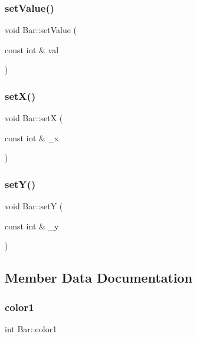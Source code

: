 \subsubsection{\texorpdfstring{set\+Value()}{setValue()}}
{\footnotesize\ttfamily void Bar\+::set\+Value (\begin{DoxyParamCaption}\item[{const int \&}]{val }\end{DoxyParamCaption})\hspace{0.3cm}{\ttfamily [inline]}}

\mbox{\label{class_bar_aa2c599d99b800583912ae4eceaceab25}} 
\subsubsection{\texorpdfstring{set\+X()}{setX()}}
{\footnotesize\ttfamily void Bar\+::setX (\begin{DoxyParamCaption}\item[{const int \&}]{\+\_\+x }\end{DoxyParamCaption})\hspace{0.3cm}{\ttfamily [inline]}}

\mbox{\label{class_bar_a0a7c832508710943849a0c1bbb583df2}} 
\subsubsection{\texorpdfstring{set\+Y()}{setY()}}
{\footnotesize\ttfamily void Bar\+::setY (\begin{DoxyParamCaption}\item[{const int \&}]{\+\_\+y }\end{DoxyParamCaption})\hspace{0.3cm}{\ttfamily [inline]}}



\subsection{Member Data Documentation}
\mbox{\label{class_bar_afb0e85e1fad2eaf310e9fc1338871471}} 
\subsubsection{\texorpdfstring{color1}{color1}}
{\footnotesize\ttfamily int Bar\+::color1\hspace{0.3cm}{\ttfamily [private]}}

